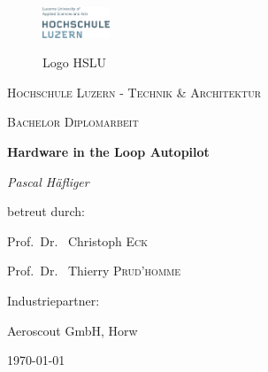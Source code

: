
\begin{titlepage}
	\centering
	
	\begin{figure}[H]
        \centering
        \includegraphics[width=0.18\textwidth]{pic/001/logo.png}
        \label{fig:logo_hslu}


        
        \captionsetup{textformat=empty,labelformat=empty} %
        \caption{Logo HSLU}
    \end{figure}

	
	
	\par\vspace{1cm}
	{\scshape\LARGE Hochschule Luzern - Technik \& Architektur\par}
	\vspace{1cm}
	{\scshape\Large Bachelor Diplomarbeit\par}
	\vspace{1.5cm}
	{\huge\bfseries Hardware in the Loop Autopilot\par}
	\vspace{2cm}
	{\Large\itshape Pascal Häfliger\par}
	\vfill
	betreut durch:\par
	Prof.~Dr.~ Christoph \textsc{Eck}\par
	Prof.~Dr.~ Thierry \textsc{Prud'homme}\par
	\vspace{1cm}
	Industriepartner:\par
  Aeroscout GmbH, Horw\par


	

	\vfill  %

	{\large \today\par}
\end{titlepage}



\clearpage